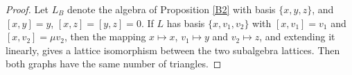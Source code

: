 \documentclass[11pt]{amsart}
\theoremstyle{plain}
\def\ad{\mathrm{ad}}
\begin{document}
\begin{proof}
Let $L_B$ denote the algebra of Proposition \ref{B2} with basis $\{x, y, z\}$, and $[x,y]=y$, $[x,z]=[y,z]=0$. 
If $L$ has basis $\{x, v_1, v_2\}$ with $[x,v_1]=v_1$ and $[x,v_2]=\mu v_2$, then the mapping $x\mapsto x$, $v_1\mapsto y$ and $v_2\mapsto z$, and extending it linearly, gives a lattice isomorphism between the two subalgebra lattices. Then both graphs have the same number of triangles. 







\end{proof}
\end{document}
